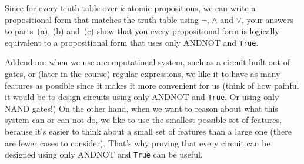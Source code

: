 Since for every truth table over $k$ atomic propositions, we can write a propositional form that matches the truth table using $\lnot$, $\land$ and $\lor$, your answers to parts~(a), (b) and~(c) show that you every propositional form is logically equivalent to a propositional form that uses only ANDNOT and \texttt {True}.

Addendum: when we use a computational system, such as a circuit built out of gates, or (later in the course) regular expressions, we like it to have as many features as possible since it makes it more convenient for us (think of how painful it would be to design circuits using only ANDNOT and \texttt {True}. Or using only NAND gates!) On the other hand, when we want to reason about what this system can or can not do, we like to use the smallest possible set of features, because it's easier to think about a small set of features than a large one (there are fewer cases to consider). That's why proving that every circuit can be designed using only ANDNOT and \texttt {True} can be useful.